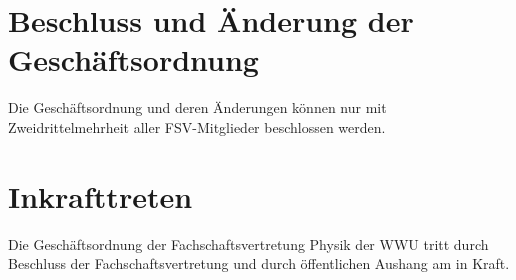 \documentclass[
	a4paper,
	12pt,
	oneside,
	parskip=half-,
	pagesize,
	headsepline,
	german,
	ngerman
]{scrartcl}
\begin{document}
\section{Beschluss und Änderung der Geschäftsordnung}
Die Geschäftsordnung und deren Änderungen können nur mit Zweidrittelmehrheit aller FSV-Mitglieder beschlossen werden.

\section{Inkrafttreten}
Die Geschäftsordnung der Fachschaftsvertretung Physik der WWU tritt durch Beschluss der Fachschaftsvertretung und durch öffentlichen Aushang am  in Kraft.
\end{document}
